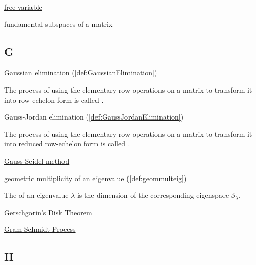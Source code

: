 \documentclass{ximera}
\begin{document}
\href{https://ximera.osu.edu/oerlinalg/LinearAlgebra/SYS-0020/main}{free variable}

fundamental subspaces of a matrix


\subsection{G}

Gaussian elimination (\ref{def:GaussianElimination})
\begin{expandable}
    The process of using the elementary row operations on a matrix to transform it into row-echelon form is called .
\end{expandable}

Gauss-Jordan elimination (\ref{def:GaussJordanElimination})
\begin{expandable}
    The process of using the elementary row operations on a matrix to transform it into reduced row-echelon form is called .
\end{expandable}

\href{https://ximera.osu.edu/oerlinalg/LinearAlgebra/SYS-0040/main}{Gauss-Seidel method}

geometric multiplicity of an eigenvalue (\ref{def:geommulteig})
\begin{expandable}
    The  of an eigenvalue $\lambda$ is the dimension of the corresponding eigenspace $\mathcal{S}_\lambda$.
\end{expandable}

\href{https://ximera.osu.edu/oerlinalg/LinearAlgebra/EIG-0080/main}{Gerschgorin's Disk Theorem}

\href{https://ximera.osu.edu/oerlinalg/LinearAlgebra/RTH-0015/main}{Gram-Schmidt Process}


\subsection{H}
\end{document}
